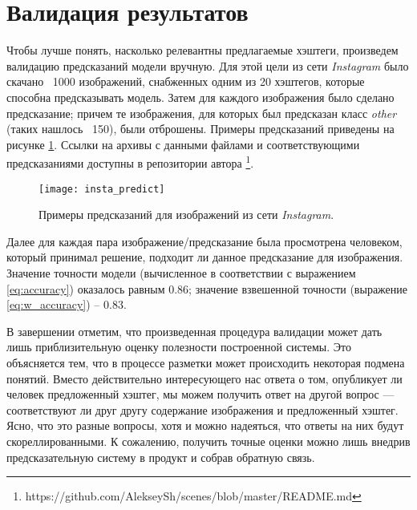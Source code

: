 \section{Валидация результатов}


\indent
\indent
Чтобы лучше понять, насколько релевантны предлагаемые хэштеги,
произведем валидацию предсказаний модели вручную. Для этой цели 
из сети \textit{Instagram} было скачано ~1000 изображений, снабженных
одним из 20 хэштегов, которые способна предсказывать модель. Затем для 
каждого изображения было сделано предсказание; причем те изображения,
для которых был предсказан класс \textit{other} (таких нашлось ~150),
были отброшены. Примеры предсказаний 
приведены на рисунке \ref{tikzpicture: insta_predict}.
Ссылки на архивы с данными файлами и 
соответствующими предсказаниями доступны в репозитории автора
\footnote{https://github.com/AlekseySh/scenes/blob/master/README.md}.
 
 
\begin{figure}[h!]
    \begin{center}
   	    \texttt{[image: insta\_predict]}
   	\end{center}
   	\caption{Примеры предсказаний для изображений из сети \textit{Instagram}.}
   	\label{tikzpicture: insta_predict}
\end{figure}


\indent
\indent
Далее для каждая пара изображение/предсказание была просмотрена человеком,
который принимал решение, подходит ли данное предсказание для изображения.
Значение точности модели (вычисленное в соответствии 
с выражением \ref{eq:accuracy}) оказалось равным 0.86; 
значение взвешенной точности (выражение \ref{eq:w_accuracy}) -- 0.83.


\indent
\indent
В завершении отметим, что произведенная процедура валидации может дать лишь
приблизительную оценку полезности построенной системы. Это объясняется
тем, что в процессе разметки может происходить некоторая подмена понятий.
Вместо действительно интересующего нас ответа о том, опубликует ли человек 
предложенный хэштег, мы можем получить ответ на другой вопрос --- 
соответствуют ли друг другу содержание изображения 
и предложенный хэштег. Ясно, что это разные вопросы, хотя и можно надеяться,
что ответы на них будут скореллированными.
К сожалению, получить точные оценки можно лишь внедрив 
предсказательную систему в продукт и собрав обратную связь.
